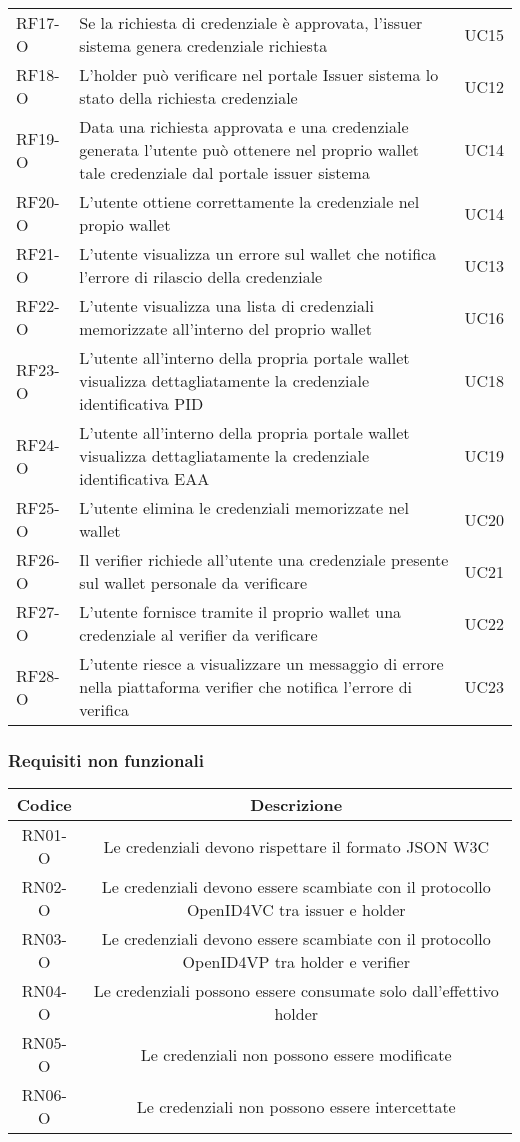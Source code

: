 \begin{longtable}{|p{}|p{}|p{}|}
        RF17-O & Se la richiesta di credenziale  è approvata, l'issuer sistema genera credenziale richiesta & UC15\\
        RF18-O & L'holder può verificare nel portale Issuer sistema lo stato della richiesta credenziale & UC12\\ 
        RF19-O & Data una richiesta approvata e una credenziale generata l'utente può ottenere nel proprio wallet tale credenziale dal portale issuer sistema & UC14 \\
        RF20-O & L'utente ottiene correttamente la credenziale nel propio wallet & UC14\\
        RF21-O & L'utente visualizza un errore sul wallet che notifica l'errore di rilascio della credenziale & UC13\\
        RF22-O & L'utente visualizza una lista di credenziali memorizzate all'interno del proprio wallet& UC16\\
        RF23-O & L'utente all'interno della propria portale wallet visualizza dettagliatamente la credenziale identificativa PID & UC18\\
        RF24-O & L'utente all'interno della propria portale wallet visualizza dettagliatamente la credenziale identificativa EAA & UC19\\
        RF25-O & L'utente elimina le credenziali memorizzate nel wallet & UC20\\
        RF26-O & Il verifier richiede all'utente una credenziale presente sul wallet personale da verificare & UC21\\
        RF27-O & L'utente fornisce tramite il proprio wallet una credenziale al verifier da verificare & UC22\\
        RF28-O & L'utente riesce a visualizzare un messaggio di errore nella piattaforma verifier che notifica l'errore di verifica & UC23\\
        \hline
    \end{longtable}

\subsubsection*{Requisiti non funzionali}
    \begin{longtable}{|c|c|}
        \hline
        \textbf{Codice} & \textbf{Descrizione} \\
        \hline
        RN01-O & Le credenziali devono rispettare il formato JSON W3C\\
        RN02-O & Le credenziali devono essere scambiate con il protocollo OpenID4VC tra issuer e holder\\
        RN03-O & Le credenziali devono essere scambiate con il protocollo OpenID4VP tra holder e verifier\\
        RN04-O & Le credenziali possono essere consumate solo dall'effettivo holder\\
        RN05-O & Le credenziali non possono essere modificate\\
        RN06-O & Le credenziali non possono essere intercettate\\
        \hline
    \end{longtable}